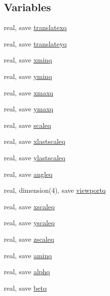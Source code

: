 \subsection*{Variables}
\begin{DoxyCompactItemize}
\item 
real, save \mbox{\hyperlink{namespacem__pixel__slices_a984b384660455b08f81e6ba889c4f181}{translatexq}}
\item 
real, save \mbox{\hyperlink{namespacem__pixel__slices_ac0ed11bf15d4d4bf8a97194d64035b02}{translateyq}}
\item 
real, save \mbox{\hyperlink{namespacem__pixel__slices_a982eea046c0a07e9767fac51b96e9c5b}{xminq}}
\item 
real, save \mbox{\hyperlink{namespacem__pixel__slices_afc89e60a080837a7d23abc70409bcde7}{yminq}}
\item 
real, save \mbox{\hyperlink{namespacem__pixel__slices_a72480fe0bf407c578fb6c6c01b929447}{xmaxq}}
\item 
real, save \mbox{\hyperlink{namespacem__pixel__slices_a9f789eabf3f49da6fdd6c713642836c5}{ymaxq}}
\item 
real, save \mbox{\hyperlink{namespacem__pixel__slices_a560f9a31fb656d89f985a6bb0c00d815}{scaleq}}
\item 
real, save \mbox{\hyperlink{namespacem__pixel__slices_ae99e40f4f0b19ff8415ac84db8532f0d}{xlastscaleq}}
\item 
real, save \mbox{\hyperlink{namespacem__pixel__slices_a15c58d927d442047ca7d648b32b0971a}{ylastscaleq}}
\item 
real, save \mbox{\hyperlink{namespacem__pixel__slices_ad82933d6a03faeb06a790664ed1e4cb7}{angleq}}
\item 
real, dimension(4), save \mbox{\hyperlink{namespacem__pixel__slices_a46f6b80eeb99ecff5fd18e41d1b17f0a}{viewportq}}
\item 
real, save \mbox{\hyperlink{namespacem__pixel__slices_aea975665739d351db83cfcc41e1914db}{xscaleq}}
\item 
real, save \mbox{\hyperlink{namespacem__pixel__slices_aff993c23736cb8fc57b8b3ebe5021ba5}{yscaleq}}
\item 
real, save \mbox{\hyperlink{namespacem__pixel__slices_af1ea5e682e81c2984c650485935a93e8}{zscaleq}}
\item 
real, save \mbox{\hyperlink{namespacem__pixel__slices_ae256fff4bec0279eb4e2439eb3973a1f}{aminq}}
\item 
real, save \mbox{\hyperlink{namespacem__pixel__slices_a72bdfc50e6b4b5a8b123083e4e529e9c}{alphq}}
\item 
real, save \mbox{\hyperlink{namespacem__pixel__slices_ab90a7c0b6645a0405a9c5e9feff7b153}{betq}}
\end{DoxyCompactItemize}


